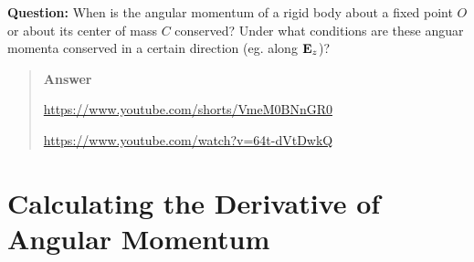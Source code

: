 \documentclass[
  letterpaper,
  DIV=11,
  numbers=noendperiod]{scrreprt}
\begin{document}
\begin{tcolorbox}[enhanced jigsaw, arc=.35mm, bottomrule=.15mm, bottomtitle=1mm, breakable, colback=white, colbacktitle=quarto-callout-tip-color!10!white, colframe=quarto-callout-tip-color-frame, coltitle=black, left=2mm, leftrule=.75mm, opacityback=0, opacitybacktitle=0.6, rightrule=.15mm, title=\textcolor{quarto-callout-tip-color}{\faLightbulb}\hspace{0.5em}{Think!}, titlerule=0mm, toprule=.15mm, toptitle=1mm]

\textbf{Question:} When is the angular momentum of a rigid body about a
fixed point \(O\) or about its center of mass \(C\) conserved? Under
what conditions are these anguar momenta conserved in a certain
direction (eg. along \({\bf E}_z\))?

\begin{quote}
\textbf{Answer}

\url{https://www.youtube.com/shorts/VmeM0BNnGR0}

\url{https://www.youtube.com/watch?v=64t-dVtDwkQ}
\end{quote}

\end{tcolorbox}

\section{Calculating the Derivative of Angular
Momentum}\label{calculating-the-derivative-of-angular-momentum}
\end{document}
